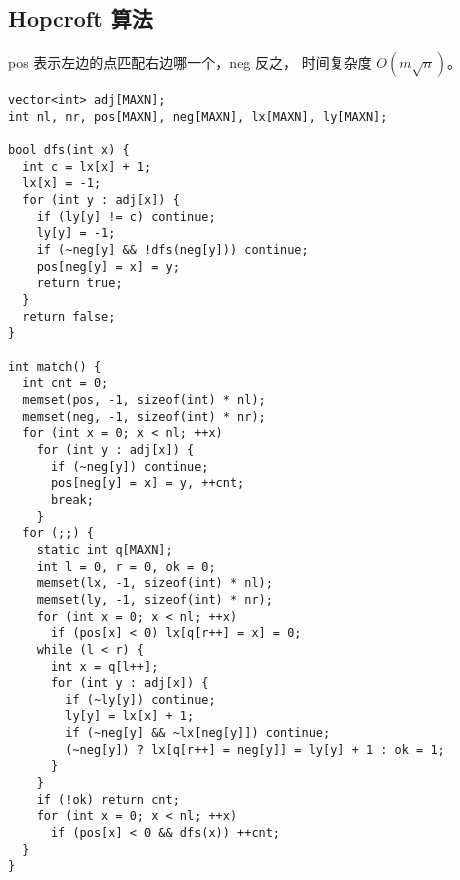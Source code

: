 \subsection{Hopcroft 算法}
pos 表示左边的点匹配右边哪一个，neg 反之，
时间复杂度 $O(m\sqrt{n})$。
\begin{lstlisting}
vector<int> adj[MAXN];
int nl, nr, pos[MAXN], neg[MAXN], lx[MAXN], ly[MAXN];

bool dfs(int x) {
  int c = lx[x] + 1;
  lx[x] = -1;
  for (int y : adj[x]) {
    if (ly[y] != c) continue;
    ly[y] = -1;
    if (~neg[y] && !dfs(neg[y])) continue;
    pos[neg[y] = x] = y;
    return true;
  }
  return false;
}

int match() {
  int cnt = 0;
  memset(pos, -1, sizeof(int) * nl);
  memset(neg, -1, sizeof(int) * nr);
  for (int x = 0; x < nl; ++x)
    for (int y : adj[x]) {
      if (~neg[y]) continue;
      pos[neg[y] = x] = y, ++cnt;
      break;
    }
  for (;;) {
    static int q[MAXN];
    int l = 0, r = 0, ok = 0;
    memset(lx, -1, sizeof(int) * nl);
    memset(ly, -1, sizeof(int) * nr);
    for (int x = 0; x < nl; ++x)
      if (pos[x] < 0) lx[q[r++] = x] = 0;
    while (l < r) {
      int x = q[l++];
      for (int y : adj[x]) {
        if (~ly[y]) continue;
        ly[y] = lx[x] + 1;
        if (~neg[y] && ~lx[neg[y]]) continue;
        (~neg[y]) ? lx[q[r++] = neg[y]] = ly[y] + 1 : ok = 1;
      }
    }
    if (!ok) return cnt;
    for (int x = 0; x < nl; ++x)
      if (pos[x] < 0 && dfs(x)) ++cnt;
  }
}
\end{lstlisting}